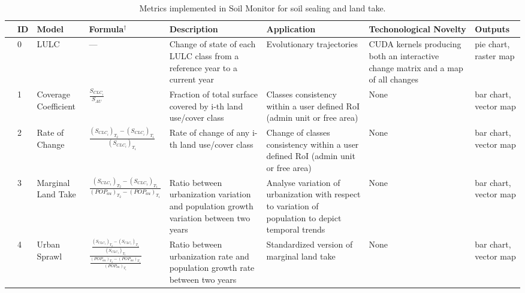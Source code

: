 \documentclass[APA,LATO1COL,doublespace]{WileyNJD-v2}
\begin{document}
\begin{table}[b]
    \caption{ Metrics implemented in Soil Monitor for soil sealing and land take. }
    \label{tab:SMappToolbox}
    \small
    \centering
    \begin{tabular}{m{0.3cm} p{0.1cm} p{1.2cm} p{3.5cm} *{3}{p{2.7cm}} p{1.0cm} }
    
    \toprule
        & \textbf{ID} & \textbf{Model} & \textbf{Formula$^\dagger$} & \textbf{Description} & \textbf{Application} & \textbf{Techonological Novelty} & \textbf{Outputs}\\
    \midrule\midrule
    
    & 0 & LULC & --- & Change of state of each LULC class from a reference year to a current year & Evolutionary trajectories & CUDA kernels producing both an interactive change matrix and a map of all changes & pie chart, raster map  \\
    
    & 1	& Coverage Coefficient & $\frac{S_{CLC_i}}{S_{AU}}$ & Fraction of total surface covered by i-th land use/cover class & Classes consistency within a user defined RoI (admin unit or free area) & None & bar chart, vector map \\
        
    & 2 & Rate of Change & 
    $\frac{ \left(S_{CLC_i}\right)_{T_2} - \left(S_{CLC_i}\right)_{T_1} }{ \left(S_{CLC_i}\right)_{T_1} }$ 
    & Rate of change of any i-th land use/cover class & Change of classes consistency within a user defined RoI (admin unit or free area) & None & bar chart, vector map \\
    
    & 3 & Marginal Land Take & 
    $\frac{ \left(S_{CLC_1}\right)_{T_2} - \left(S_{CLC_1}\right)_{T_1} }{ \left(POP_{au}\right)_{T_2} - \left(POP_{au}\right)_{T_1} }$
    & Ratio between urbanization variation and population growth variation between two years & Analyse variation of urbanization with respect to variation of population to depict temporal trends & None & bar chart, vector map \\
    
    & 4	& Urban Sprawl & 
    $\frac{ \frac{ \left(S_{CLC_1}\right)_{T_2} - \left(S_{CLC_1}\right)_{T_1} }{ \left(S_{CLC_1}\right)_{T_1} }  }     { \frac{ \left(POP_{au}\right)_{T_2} - \left(POP_{au}\right)_{T_1} }{ \left(POP_{au}\right)_{T_1} } }$
    & Ratio between urbanization rate and population growth rate between two years & Standardized version of marginal land take & None & bar chart, vector map \\
    

\end{tabular}
\end{table}
\end{document}
